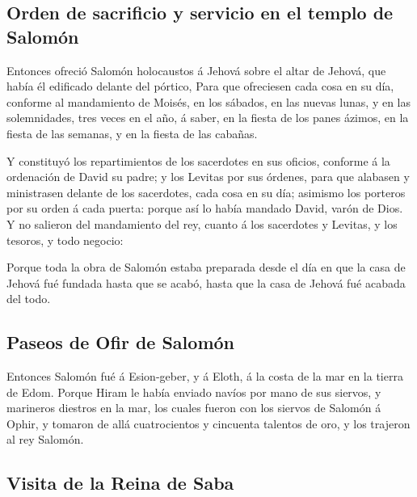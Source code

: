 \hypertarget{orden-de-sacrificio-y-servicio-en-el-templo-de-salomuxf3n}{%
\subsection{Orden de sacrificio y servicio en el templo de
Salomón}\label{orden-de-sacrificio-y-servicio-en-el-templo-de-salomuxf3n}}

 Entonces ofreció Salomón holocaustos á Jehová sobre el
altar de Jehová, que había él edificado delante del pórtico,
 Para que ofreciesen cada cosa en su día, conforme al
mandamiento de Moisés, en los sábados, en las nuevas lunas, y en las
solemnidades, tres veces en el año, á saber, en la fiesta de los panes
ázimos, en la fiesta de las semanas, y en la fiesta de las cabañas.

 Y constituyó los repartimientos de los sacerdotes en sus
oficios, conforme á la ordenación de David su padre; y los Levitas por
sus órdenes, para que alabasen y ministrasen delante de los sacerdotes,
cada cosa en su día; asimismo los porteros por su orden á cada puerta:
porque así lo había mandado David, varón de Dios.  Y no
salieron del mandamiento del rey, cuanto á los sacerdotes y Levitas, y
los tesoros, y todo negocio:

 Porque toda la obra de Salomón estaba preparada desde el
día en que la casa de Jehová fué fundada hasta que se acabó, hasta que
la casa de Jehová fué acabada del todo.

\hypertarget{paseos-de-ofir-de-salomuxf3n}{%
\subsection{Paseos de Ofir de
Salomón}\label{paseos-de-ofir-de-salomuxf3n}}

 Entonces Salomón fué á Esion-geber, y á Eloth, á la costa
de la mar en la tierra de Edom.  Porque Hiram le había
enviado navíos por mano de sus siervos, y marineros diestros en la mar,
los cuales fueron con los siervos de Salomón á Ophir, y tomaron de allá
cuatrocientos y cincuenta talentos de oro, y los trajeron al rey
Salomón.

\hypertarget{visita-de-la-reina-de-saba}{%
\subsection{Visita de la Reina de
Saba}\label{visita-de-la-reina-de-saba}}

